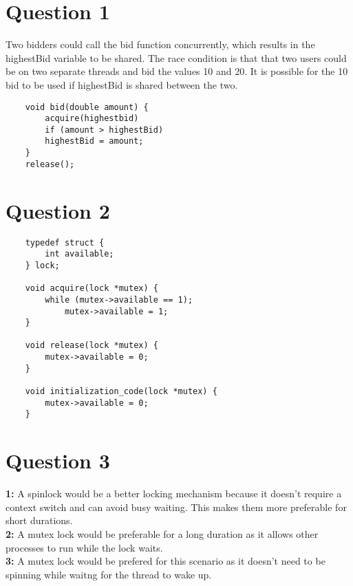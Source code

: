 \documentclass[11pt]{article}
\begin{document}
\maketitle

\section*{Question 1}
Two bidders could call the bid function concurrently, which
results in the highestBid variable to be shared. The race condition
is that that two users could be on two separate threads and bid
the values 10 and 20. It is possible for the 10 bid to be used 
if highestBid is shared between the two. \\
\begin{verbatim}
    void bid(double amount) {
        acquire(highestbid)
        if (amount > highestBid)
        highestBid = amount;
    }
    release();
\end{verbatim}

\newpage
\section*{Question 2}
\begin{verbatim}
    typedef struct {
        int available;
    } lock;

    void acquire(lock *mutex) {
        while (mutex->available == 1); 
            mutex->available = 1; 
    }

    void release(lock *mutex) {
        mutex->available = 0;
    }

    void initialization_code(lock *mutex) {
        mutex->available = 0;
    }
\end{verbatim}


\section*{Question 3}
\textbf{1:} A spinlock would be a better locking mechanism
because it doesn't require a context switch and can avoid busy 
waiting. This makes them more preferable for short durations.\\
\textbf{2:} A mutex lock would be preferable for a long 
duration as it allows other processes to run while the lock
waits.\\
\textbf{3:} A mutex lock would be prefered for this scenario as it 
doesn't need to be spinning while waitng for the thread to wake up.

\newpage
\end{document}
